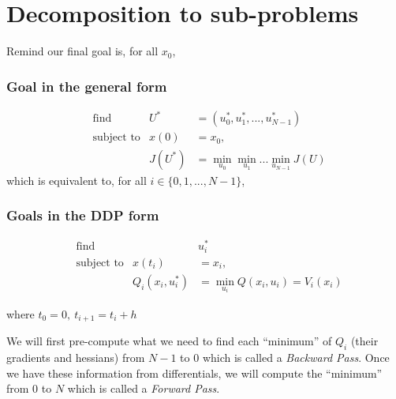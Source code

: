 \documentclass{report}
\begin{document}
\section{Decomposition to sub-problems}
Remind our final goal is, for all $x_0$,

\subsubsection{Goal in the general form}

\begin{equation}
\begin{aligned}
&\text{find}             &U^* & = (u_0^*, u_1^*, ... , u_{N-1}^*) \\
&\text{subject to}       &x(0)      &= x_0,  \\
&							      &J(U^*)  &= \min_{u_0} \min_{u_1} ... \min_{u_{N-1}} J(U)
\end{aligned}
\end{equation}
%
which is equivalent to, for all $i\in \{0, 1, ..., N-1\}$,

\subsubsection{Goals in the DDP form}

\begin{equation}
\begin{aligned}
&\text{find}             && u_i^* \\
&\text{subject to}       &x(t_i)      &= x_i,  \\
&							      &Q_i(x_i, u_i^*) &= \min_{u_i} Q(x_i, u_i) = V_i(x_i)
\end{aligned}
\end{equation}

where $t_0 = 0, \ t_{i+1} = t_i + h  $

We will first pre-compute what we need to find each ``minimum'' of $Q_i$ (their gradients and hessians) from $N-1$ to $0$ which is called a \emph{Backward Pass}. Once we have these information from differentials, we will compute the ``minimum'' from $0$ to $N$ which is called a \emph{Forward Pass}.
\end{document}
